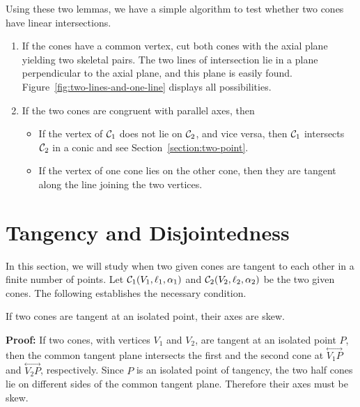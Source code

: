      Using these two lemmas, we have a simple algorithm to test whether two 
cones have linear intersections.
\begin{enumerate}
     \item If the cones have a common vertex, cut both cones with the axial
          plane yielding  two skeletal pairs. The two lines of intersection
          lie in a plane perpendicular to the axial plane, and this plane
          is easily found. 
          Figure~\ref{fig:two-lines-and-one-line} displays all possibilities.
     \item If the two cones are congruent with parallel axes, then
     \begin{itemize}
          \item If the vertex of ${\cal C}_1$ does not lie on ${\cal C}_2$, and
               vice versa, then ${\cal C}_1$ intersects ${\cal C}_2$ in a conic
               and see Section~\ref{section:two-point}.
          \item If the vertex of one cone lies on the other cone, then they
               are tangent along the line joining the two vertices.
     \end{itemize}
\end{enumerate}


\section{Tangency and Disjointedness}
\label{section:tangency-disjoint}
     In this section, we will study when two given cones are tangent to each
other in a finite number of points.  Let ${\cal C}_1(V_1,\ell_1,\alpha_1)$ and
${\cal C}_2(V_2,\ell_2,\alpha_2)$ be the two given cones.  The following 
establishes the necessary condition.

\begin{lemma}
\label{lemma:point-tangent-has-skew-axes}
     If two cones are tangent at an isolated point, their axes are skew.
\end{lemma}
{\bf Proof:}  If two cones, with vertices $V_1$ and $V_2$, are tangent at an
isolated point $P$, then the common tangent plane intersects the first and the
second cone at $\stackrel{\longleftrightarrow}{V_1P}$ and
$\stackrel{\longleftrightarrow}{V_2P}$, respectively.  Since $P$ is an isolated
point of tangency, the two half cones lie on different sides of the common
tangent plane.  Therefore their axes must be skew.\ \ \ \QED

